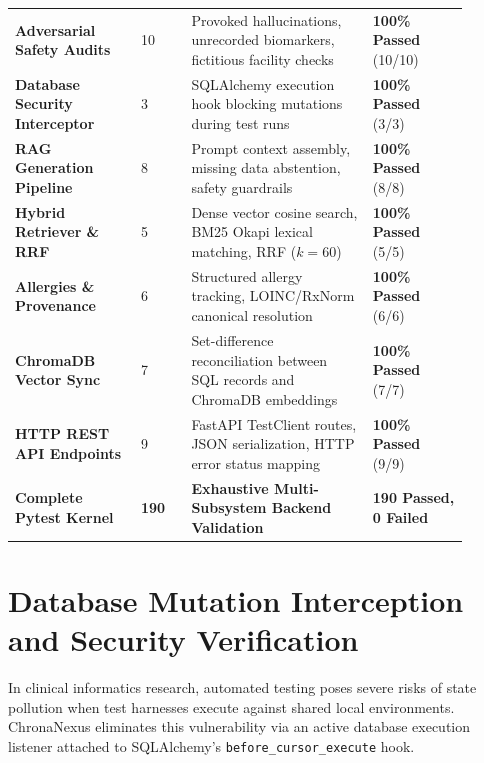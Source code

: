 \begin{longtable}{@{}p{0.25\linewidth} p{0.10\linewidth} p{0.36\linewidth} p{0.19\linewidth}@{}}
\textbf{Adversarial Safety Audits} & 10 & Provoked hallucinations, unrecorded biomarkers, fictitious facility checks & \textbf{100\% Passed} (10/10) \\
\textbf{Database Security Interceptor} & 3 & SQLAlchemy execution hook blocking mutations during test runs & \textbf{100\% Passed} (3/3) \\
\textbf{RAG Generation Pipeline} & 8 & Prompt context assembly, missing data abstention, safety guardrails & \textbf{100\% Passed} (8/8) \\
\textbf{Hybrid Retriever \& RRF} & 5 & Dense vector cosine search, BM25 Okapi lexical matching, RRF ($k=60$) & \textbf{100\% Passed} (5/5) \\
\textbf{Allergies \& Provenance} & 6 & Structured allergy tracking, LOINC/RxNorm canonical resolution & \textbf{100\% Passed} (6/6) \\
\textbf{ChromaDB Vector Sync} & 7 & Set-difference reconciliation between SQL records and ChromaDB embeddings & \textbf{100\% Passed} (7/7) \\
\textbf{HTTP REST API Endpoints} & 9 & FastAPI TestClient routes, JSON serialization, HTTP error status mapping & \textbf{100\% Passed} (9/9) \\
\midrule
\textbf{Complete Pytest Kernel} & \textbf{190} & \textbf{Exhaustive Multi-Subsystem Backend Validation} & \textbf{190 Passed, 0 Failed} \\
\bottomrule
\end{longtable}
\normalsize


\section{Database Mutation Interception and Security Verification}
\label{sec:db_interception_verification}

In clinical informatics research, automated testing poses severe risks of state pollution when test harnesses execute against shared local environments. ChronaNexus eliminates this vulnerability via an active database execution listener attached to SQLAlchemy's \texttt{before\_cursor\_execute} hook.

